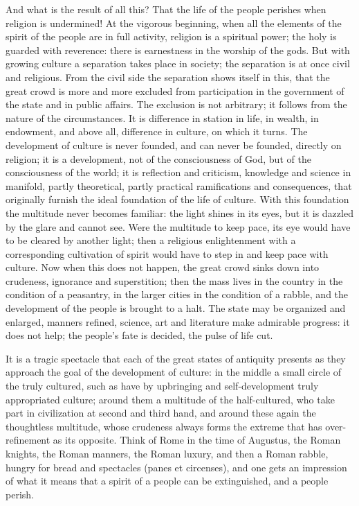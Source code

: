 \documentclass[12pt]{book}
\newcommand{\opage}[1]{\marginnote{\footnotesize\textit{[#1]}}}
\begin{document}
And what is the result of all this? That the life of the people perishes
when religion is undermined! At the vigorous beginning, when all the
elements of the spirit of the people are in full activity, religion is
a spiritual
\opage{51}\setcounter{footnote}{0}%
power; the holy is guarded with reverence: there is earnestness in the
worship of the gods. But with growing culture a separation takes place
in society; the separation is at once civil and religious. From the
civil side the separation shows itself in this, that the great crowd is
more and more excluded from participation in the government of the
state and in public affairs. The exclusion is not arbitrary; it follows
from the nature of the circumstances. It is difference in station in
life, in wealth, in endowment, and above all, difference in culture,
on which it turns. The development of culture is never founded, and can
never be founded, directly on religion; it is a development, not of the
consciousness of God, but of the consciousness of the world; it is
reflection and criticism, knowledge and science in manifold, partly
theoretical, partly practical ramifications and consequences, that
originally furnish the ideal foundation of the life of culture. With
this foundation the multitude never becomes familiar: the light shines
in its eyes, but it is dazzled by the glare and cannot see. Were the
multitude to keep pace, its eye would have to be cleared by another
light; then a religious enlightenment with a corresponding cultivation
of spirit would have to step in and keep pace with culture. Now when
this does not happen, the great crowd sinks down into crudeness,
ignorance and superstition; then the mass lives in the country in the
condition of a peasantry, in the larger cities in the condition of a
rabble, and the development of the people is brought to a halt. The
state may be organized and enlarged, manners refined, science, art and
literature make admirable progress: it does not help; the people's fate
is decided, the pulse of life cut.

It is a tragic spectacle that each of the great states of antiquity
presents as they approach the goal of the development of culture: in the
middle a small circle of the truly cultured, such as have by upbringing
and self-development
\opage{52}\setcounter{footnote}{0}%
truly appropriated culture; around them a multitude of the half-cultured,
who take part in civilization at second and third hand, and around these
again the thoughtless multitude, whose crudeness always forms the
extreme that has over-refinement as its opposite. Think of Rome in the
time of Augustus, the Roman knights, the Roman manners, the Roman luxury,
and then a Roman rabble, hungry for bread and spectacles (panes et
circenses), and one gets an impression of what it means that a spirit of
a people can be extinguished, and a people perish.
\end{document}
